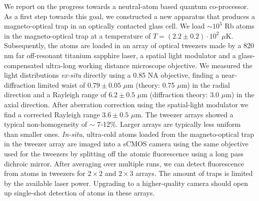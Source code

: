 \noindent We report on the progress towards a neutral-atom based quantum co-processor.
As a first step towards this goal, we constructed a new apparatus that produces a magneto-optical trap in an optically contacted glass cell. 
We load $\sim 10^5$ Rb atoms in the magneto-optical trap at a temperature of $T=(2.2\pm0.2) \cdot 10^2$ $\mu$K.
Subsequently, the atoms are loaded in an array of optical tweezers made by a 820 nm far off-resonant titanium sapphire laser, a spatial light modulator and a glass-compensated ultra-long working distance microscope objective.
We measured the light distributions \textit{ex-situ} directly using a 0.85 NA objective, finding a near-diffraction limited waist of $0.79\pm0.05$ $\mu$m (theory: 0.75 $\mu$m) in the radial direction and a Rayleigh range of $6.2 \pm 0.5$ $\mu$m (diffraction theory: 3.0 $\mu$m) in the axial direction.
After aberration correction using the spatial-light modulator we find a corrected Rayleigh range $3.6\pm0.5$ $\mu$m.
The tweezer arrays showed a typical non-homogeneity of $\sim$ 7-12\%.
Larger arrays are typically less uniform than smaller ones. 
\textit{In-situ}, ultra-cold atoms loaded from the magneto-optical trap in the tweezer array are imaged into a sCMOS camera using the same objective used for the tweezers by splitting off the atomic fluorescence using a long pass dichroic mirror.
After averaging over multiple runs, we can detect fluorescence from atoms in tweezers for $2\times2$ and $2\times3$ arrays.
The amount of traps is limited by the available laser power. 
Upgrading to a higher-quality camera should open up single-shot detection of atoms in these arrays. 
